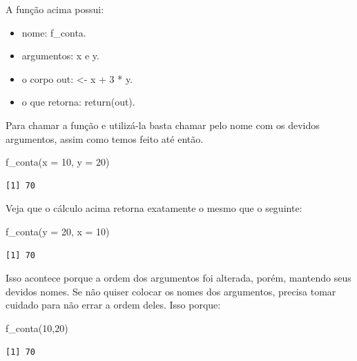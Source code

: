 \documentclass[
  letterpaper,
  DIV=11,
  numbers=noendperiod]{scrreprt}
\newenvironment{Shaded}{\begin{snugshade}}{\end{snugshade}}
\newcommand{\AttributeTok}[1]{\textcolor[rgb]{0.40,0.45,0.13}{#1}}
\newcommand{\DecValTok}[1]{\textcolor[rgb]{0.68,0.00,0.00}{#1}}
\newcommand{\FunctionTok}[1]{\textcolor[rgb]{0.28,0.35,0.67}{#1}}
\newcommand{\NormalTok}[1]{\textcolor[rgb]{0.00,0.23,0.31}{#1}}
\begin{document}
A função acima possui:

\begin{itemize}
\item
  nome: f\_conta.
\item
  argumentos: x e y.
\item
  o corpo out: \textless- x + 3 * y.
\item
  o que retorna: return(out).
\end{itemize}

Para chamar a função e utilizá-la basta chamar pelo nome com os devidos
argumentos, assim como temos feito até então.

\begin{Shaded}
\begin{Highlighting}[]
\FunctionTok{f\_conta}\NormalTok{(}\AttributeTok{x =} \DecValTok{10}\NormalTok{, }\AttributeTok{y =} \DecValTok{20}\NormalTok{)}
\end{Highlighting}
\end{Shaded}

\begin{verbatim}
[1] 70
\end{verbatim}

Veja que o cálculo acima retorna exatamente o mesmo que o seguinte:

\begin{Shaded}
\begin{Highlighting}[]
\FunctionTok{f\_conta}\NormalTok{(}\AttributeTok{y =} \DecValTok{20}\NormalTok{, }\AttributeTok{x =} \DecValTok{10}\NormalTok{)}
\end{Highlighting}
\end{Shaded}

\begin{verbatim}
[1] 70
\end{verbatim}

Isso acontece porque a ordem dos argumentos foi alterada, porém,
mantendo seus devidos nomes. Se não quiser colocar os nomes dos
argumentos, precisa tomar cuidado para não errar a ordem deles. Isso
porque:

\begin{Shaded}
\begin{Highlighting}[]
\FunctionTok{f\_conta}\NormalTok{(}\DecValTok{10}\NormalTok{,}\DecValTok{20}\NormalTok{)}
\end{Highlighting}
\end{Shaded}

\begin{verbatim}
[1] 70
\end{verbatim}
\end{document}
